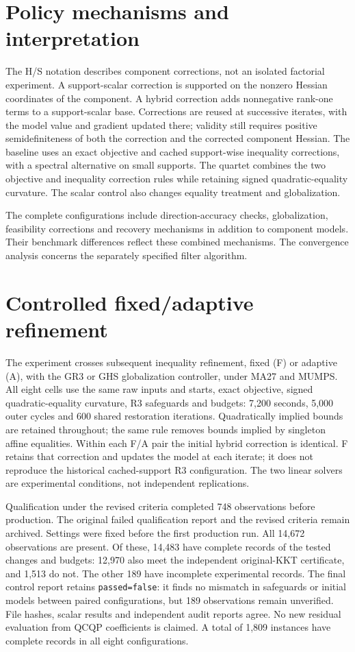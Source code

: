 \documentclass[pdflatex,sn-mathphys-num]{sn-jnl}
\theoremstyle{thmstyleone}
\theoremstyle{thmstylethree}
\newcounter{algorithm}
\begin{document}
\section{Policy mechanisms and interpretation}\label{app:policy-mechanisms}
The H/S notation describes component corrections, not an isolated
factorial experiment. A support-scalar correction is supported on the
nonzero Hessian coordinates of the component. A hybrid correction adds
nonnegative rank-one terms to a support-scalar base. Corrections are reused
at successive iterates, with the model value and gradient updated there;
validity still
requires positive semidefiniteness of both the correction and the corrected
component Hessian. The baseline uses an exact objective and cached
support-wise inequality corrections, with a spectral alternative on
small supports. The quartet combines the two objective and inequality
correction rules while retaining signed quadratic-equality curvature.
The scalar control also changes equality treatment and globalization.

The complete configurations include direction-accuracy checks,
globalization, feasibility corrections and recovery mechanisms in
addition to component models. Their benchmark differences reflect these
combined mechanisms. The convergence analysis concerns the separately
specified filter algorithm.

\section{Controlled fixed/adaptive refinement}\label{app:controlled-refinement}
The experiment crosses subsequent inequality refinement, fixed (F)
or adaptive (A), with the GR3 or GHS globalization controller, under MA27
and MUMPS. All eight cells use the same raw inputs and starts, exact
objective, signed quadratic-equality curvature, R3 safeguards and
budgets: 7,200 seconds, 5,000 outer cycles and 600 shared restoration
iterations. Quadratically implied bounds are retained throughout; the
same rule removes bounds implied by singleton affine equalities. Within
each F/A pair the initial hybrid correction is identical. F retains that
correction and updates the model at each iterate; it does not reproduce
the historical cached-support R3 configuration. The two linear solvers
are experimental conditions, not independent replications.

Qualification under the revised criteria completed 748 observations before
production. The original failed qualification report and the revised
criteria remain archived. Settings were fixed before the first production
run. All 14,672 observations are present. Of these, 14,483 have complete
records of the tested changes and budgets: 12,970 also meet the independent
original-KKT certificate, and 1,513 do not. The other 189 have incomplete
experimental records. The final control report retains
\texttt{passed=false}: it finds no mismatch in safeguards or initial models
between paired configurations, but 189 observations remain unverified.
File hashes, scalar results and independent audit reports agree. No new
residual evaluation from QCQP coefficients is claimed. A total of 1,809
instances have complete records in all eight configurations.
\end{document}
